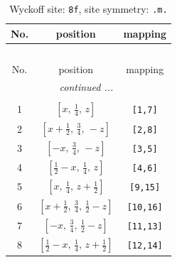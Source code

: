 \documentclass[fleqn,8pt]{jsarticle}
\begin{document}
\begin{longtable}{ccc}
\caption{Wyckoff site: {\tt 8f}, site symmetry: {\tt .m.}}
 \\
 \hline \hline
No. & position & mapping \\ \hline \endfirsthead

\multicolumn{2}{l}{\tablename\ \thetable{}} \\
 \hline \hline
No. & position & mapping \\ \hline \endhead

 \hline \hline
\multicolumn{2}{r}{\footnotesize\it continued ...} \\ \endfoot

 \hline \hline
\multicolumn{2}{r}{} \\ \endlastfoot

1 & $\left[ x,\, \frac{1}{4},\, z \right]$ & {\tt [1,7]} \\ \hline
2 & $\left[ x + \frac{1}{2},\, \frac{3}{4},\, - z \right]$ & {\tt [2,8]} \\ \hline
3 & $\left[ - x,\, \frac{3}{4},\, - z \right]$ & {\tt [3,5]} \\ \hline
4 & $\left[ \frac{1}{2} - x,\, \frac{1}{4},\, z \right]$ & {\tt [4,6]} \\ \hline
5 & $\left[ x,\, \frac{1}{4},\, z + \frac{1}{2} \right]$ & {\tt [9,15]} \\ \hline
6 & $\left[ x + \frac{1}{2},\, \frac{3}{4},\, \frac{1}{2} - z \right]$ & {\tt [10,16]} \\ \hline
7 & $\left[ - x,\, \frac{3}{4},\, \frac{1}{2} - z \right]$ & {\tt [11,13]} \\ \hline
8 & $\left[ \frac{1}{2} - x,\, \frac{1}{4},\, z + \frac{1}{2} \right]$ & {\tt [12,14]} \\
\end{longtable}
\renewcommand{\arraystretch}{1.2}
\end{document}
